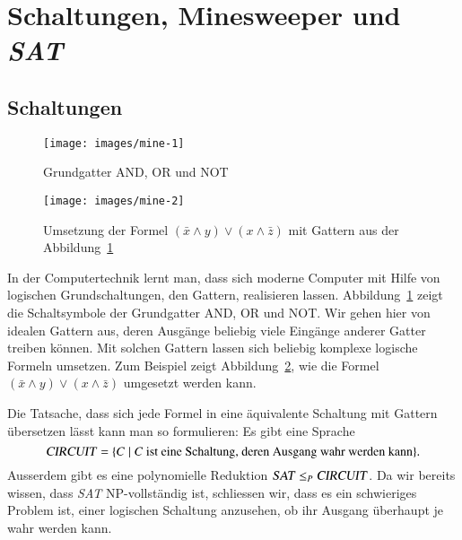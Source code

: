 %
%
%
\section{Schaltungen, Minesweeper und \textsl{SAT}}
%
\subsection{Schaltungen}
\begin{figure}
\begin{center}
\texttt{[image: images/mine-1]}
\end{center}
\caption{Grundgatter AND, OR und NOT\label{gatter}}
\end{figure}%
\begin{figure}
\begin{center}
\texttt{[image: images/mine-2]}
\end{center}
\caption{Umsetzung der Formel
$(\bar x\wedge y)\vee(x\wedge \bar z)$ mit Gattern aus der
Abbildung~\ref{gatter}\label{gatterformel}}
\end{figure}%
%
%
%
%
In der Computertechnik lernt man, dass sich moderne Computer mit
Hilfe von logischen Grundschaltungen, den Gattern, realisieren lassen.
Abbildung~\ref{gatter} zeigt die Schaltsymbole der Grundgatter AND, OR
und NOT.
Wir gehen hier von idealen Gattern aus, deren Ausgänge beliebig
viele Eingänge anderer Gatter treiben können.
Mit solchen Gattern lassen sich beliebig komplexe logische Formeln umsetzen.
Zum Beispiel
zeigt Abbildung~\ref{gatterformel}, wie die Formel
$(\bar x\wedge y)\vee(x\wedge \bar z)$ umgesetzt werden kann.

%
Die Tatsache, dass sich jede Formel in eine äquivalente Schaltung mit Gattern
übersetzen lässt kann man so formulieren: Es gibt eine Sprache
\[
\text{\textsl{CIRCUIT}}=\{
C\;|\; \text{$C$ ist eine Schaltung, deren Ausgang wahr werden kann}\}.
\]
Ausserdem gibt es eine polynomielle Reduktion
$\text{\textsl{SAT}}\le_P\text{\textsl{CIRCUIT}}$.
Da wir bereits wissen,
dass \textsl{SAT} NP-vollständig ist, schliessen wir, dass es ein schwieriges
Problem ist, einer logischen Schaltung anzusehen, ob ihr Ausgang überhaupt
je wahr werden kann.

